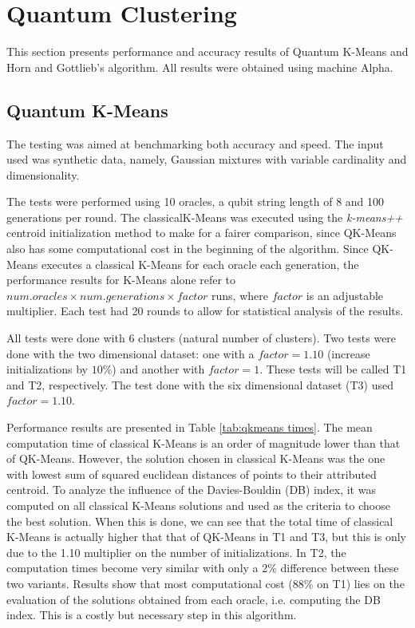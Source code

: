 
\section{Quantum Clustering}

This section presents performance and accuracy results of Quantum K-Means and Horn and Gottlieb's algorithm.
All results were obtained using machine Alpha.

\subsection{Quantum K-Means}

The testing was aimed at benchmarking both accuracy and speed.
The input used was synthetic data, namely, Gaussian mixtures with variable cardinality and dimensionality.

The tests were performed using 10 oracles, a qubit string length of 8 and 100 generations per round.
The classicalK-Means was executed using the \emph{k-means++} centroid initialization method to make for a fairer comparison, since QK-Means also has some computational cost in the beginning of the algorithm.
Since QK-Means executes a classical K-Means for each oracle each generation, the performance results for K-Means alone refer to $num.oracles \times num.generations \times factor$ runs, where $factor$ is an adjustable multiplier.
Each test had 20 rounds to allow for statistical analysis of the results.

All tests were done with 6 clusters (natural number of clusters).
Two tests were done with the two dimensional dataset: one with a $factor=1.10$ (increase initializations by $10\%$) and another with $factor=1$.
These tests will be called T1 and T2, respectively.
The test done with the six dimensional dataset (T3) used $factor=1.10$.

Performance results are presented in Table \ref{tab:qkmeans times}.
The mean computation time of classical K-Means is an order of magnitude lower than that of QK-Means.
However, the solution chosen in classical K-Means was the one with lowest sum of squared euclidean distances of points to their attributed centroid.
To analyze the influence of the Davies-Bouldin (DB) index, it was computed on all classical K-Means solutions and used as the criteria to choose the best solution.
When this is done, we can see that the total time of classical K-Means is actually higher that that of QK-Means in T1 and T3, but this is only due to the 1.10 multiplier on the number of initializations.
In T2, the computation times become very similar with only a 2\% difference between these two variants.
Results show that most computational cost (88\% on T1) lies on the evaluation of the solutions obtained from each oracle, i.e. computing the DB index.
This is a costly but necessary step in this algorithm.


